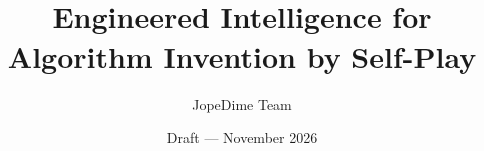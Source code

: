\documentclass[10pt,twocolumn,letterpaper]{article}
\title{{\huge\bfseries \EZ{}}\\[6pt]
  {\Large Engineered Intelligence for Algorithm Invention by Self-Play}}
\author{JopeDime Team}
\date{Draft --- November 2026}
\begin{document}
\maketitle









\FloatBarrier

\appendix

\FlushFloatsInPlace\FloatBarrier%


\end{document}
